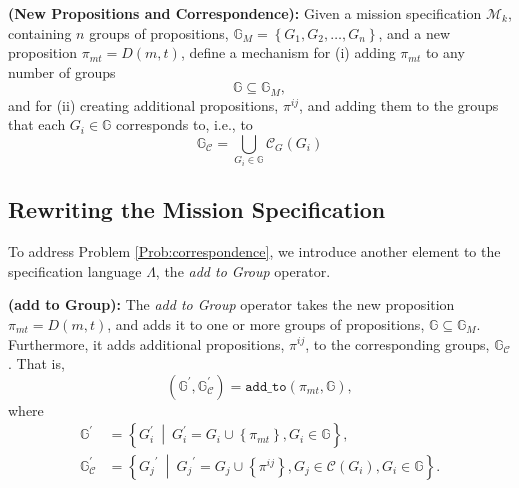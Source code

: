 \begin{myProblem}\label{Prob:correspondence} %
	\textbf{(New Propositions and Correspondence):} Given a mission specification $\mathcal{M}_k$, containing $n$ groups of propositions, $\mathbb{G}_M = \left\{ G_1, G_2, \ldots, G_n \right\}$, and a new proposition $\pi_{mt} = D(m, t)$, define a mechanism for (i) adding $\pi_{mt}$ to any number of groups
	$$ \mathbb{G} \subseteq \mathbb{G}_M,$$
	and for (ii) creating additional propositions, $\pi^{ij}$, and adding them to the groups that each $G_i \in \mathbb{G}$ corresponds to, i.e., to
	$$ \mathbb{G}_\mathcal{C} = \bigcup_{G_i \in \mathbb{G}} \mathcal{C}_G (G_i) $$
\end{myProblem}

\subsection{Rewriting the Mission Specification}\label{rewriting}

To address Problem \ref{Prob:correspondence}, we introduce another element to the specification language $\Lambda$, the \emph{add to Group} operator.

\begin{myDefinition}\label{Def:addto}
	\textbf{(add to Group):} The \emph{add to Group} operator takes the new proposition $\pi_{mt} = D(m,t)$, and adds it to one or more groups of propositions, 
	$ \mathbb{G} \subseteq \mathbb{G}_M$.
	Furthermore, it adds additional propositions, $\pi^{ij}$, to the corresponding groups,
	$\mathbb{G}_\mathcal{C}$.
	That is,
	\begin{equation}
		(\mathbb{G}^\prime, \mathbb{G}_{\mathcal{C}}^\prime) = \texttt{add\_to}(\pi_{mt}, \mathbb{G}),
	\end{equation}
	where
	\begin{subequations}
	\begin{align*}
		\mathbb{G}^\prime &= \left\{ G_i^\prime \: \middle| \: G_i^\prime = G_i \cup \left\{ \pi_{mt} \right\}, G_i \in \mathbb{G} \right\},\\
		\mathbb{G}_{\mathcal{C}}^\prime &= \left\{{G_j}^\prime \: \middle| \: {G_j}^\prime = G_j \cup \left\{ \pi^{ij} \right\}, G_j \in \mathcal{C}(G_i), G_i \in \mathbb{G} \right\}.
	\end{align*}
	\end{subequations}
\end{myDefinition}

